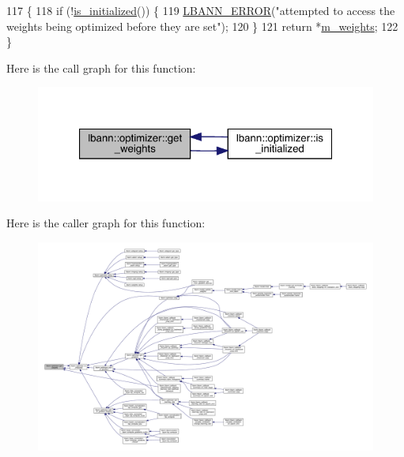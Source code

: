\begin{DoxyCode}
117                                 \{
118   \textcolor{keywordflow}{if} (!\hyperlink{classlbann_1_1optimizer_abccf0babf69e3d7c6e9a7fd0731c79b7}{is\_initialized}()) \{
119     \hyperlink{base_8hpp_a80b1d707117e968a6951b7222e4b2b87}{LBANN\_ERROR}(\textcolor{stringliteral}{"attempted to access the weights being optimized before they are set"});
120   \}
121   \textcolor{keywordflow}{return} *\hyperlink{classlbann_1_1optimizer_a33b57b578a089d9ffe6715bb3996907c}{m\_weights};
122 \}
\end{DoxyCode}
Here is the call graph for this function\+:\nopagebreak
\begin{figure}[H]
\begin{center}
\leavevmode
\includegraphics[width=321pt]{classlbann_1_1optimizer_a9c3fc3f1d45da822676d5932a1c7af82_cgraph}
\end{center}
\end{figure}
Here is the caller graph for this function\+:\nopagebreak
\begin{figure}[H]
\begin{center}
\leavevmode
\includegraphics[width=350pt]{classlbann_1_1optimizer_a9c3fc3f1d45da822676d5932a1c7af82_icgraph}
\end{center}
\end{figure}
\mbox{\label{classlbann_1_1optimizer_abccf0babf69e3d7c6e9a7fd0731c79b7}} 
